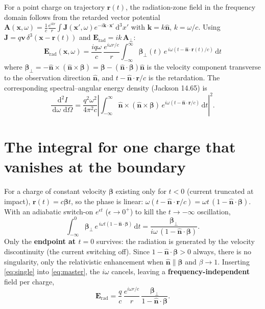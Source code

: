 \documentclass[11pt]{article}
\newcommand{\nhat}{\hat{\bm{n}}}
\newcommand{\bbeta}{\bm{\beta}}
\newcommand{\bE}{\bm{E}}
\newcommand{\bA}{\bm{A}}
\newcommand{\bJ}{\bm{J}}
\newcommand{\br}{\bm{r}}
\newcommand{\bk}{\bm{k}}
\newcommand{\bv}{\bm{v}}
\newcommand{\dd}{\,\mathrm{d}}
\begin{document}
For a point charge on trajectory $\br(t)$, the radiation-zone field in the
frequency domain follows from the retarded vector potential
$\bA(\bm{x},\omega)=\frac{1}{c}\frac{e^{ikr}}{r}\int
\bJ(\bm{x}',\omega)e^{-i\bk\cdot\bm{x}'}\dd^3x'$ with $\bk=k\nhat$,
$k=\omega/c$. Using $\bJ=q\bv\,\delta^3(\bm{x}-\br(t))$ and
$\bE_{\mathrm{rad}}=ik\,\bA_\perp$:
\begin{equation}
\boxed{\;
\bE_{\mathrm{rad}}(\bm{x},\omega)=\frac{iq\omega}{c}\,
\frac{e^{i\omega r/c}}{r}
\int_{-\infty}^{\infty}\bbeta_\perp(t)\,
e^{\,i\omega\left(t-\nhat\cdot\br(t)/c\right)}\dd t
\;}
\label{eq:master}
\end{equation}
where $\bbeta_\perp=-\nhat\times(\nhat\times\bbeta)
=\bbeta-(\nhat\cdot\bbeta)\nhat$ is the velocity component transverse to the
observation direction $\nhat$, and $t-\nhat\cdot\br/c$ is the retardation. The
corresponding spectral--angular energy density (Jackson 14.65) is
\begin{equation}
\frac{\dd^2 I}{\dd\omega\,\dd\Omega}=\frac{q^2\omega^2}{4\pi^2 c}
\left|\int_{-\infty}^{\infty}\nhat\times(\nhat\times\bbeta)\,
e^{i\omega(t-\nhat\cdot\br/c)}\dd t\right|^2 .
\label{eq:energy}
\end{equation}

\section{The integral for one charge that vanishes at the boundary}

For a charge of constant velocity $\bbeta$ existing only for $t<0$ (current
truncated at impact), $\br(t)=c\bbeta t$, so the phase is linear:
$\omega(t-\nhat\cdot\br/c)=\omega t\,(1-\nhat\cdot\bbeta)$. With an adiabatic
switch-on $e^{\epsilon t}$ ($\epsilon\to0^+$) to kill the $t\to-\infty$
oscillation,
\begin{equation}
\int_{-\infty}^{0}\bbeta_\perp\,
e^{\,i\omega t(1-\nhat\cdot\bbeta)}\dd t
=\frac{\bbeta_\perp}{i\omega\,(1-\nhat\cdot\bbeta)} .
\label{eq:single}
\end{equation}
Only the \textbf{endpoint at $t=0$} survives: the radiation is generated by the
velocity discontinuity (the current switching off). Since
$1-\nhat\cdot\bbeta>0$ always, there is no singularity, only the relativistic
enhancement when $\nhat\parallel\bbeta$ and $\beta\to1$. Inserting
\eqref{eq:single} into \eqref{eq:master}, the $i\omega$ cancels, leaving a
\textbf{frequency-independent} field per charge,
\begin{equation}
\bE_{\mathrm{rad}}=\frac{q}{c}\,\frac{e^{i\omega r/c}}{r}\,
\frac{\bbeta_\perp}{1-\nhat\cdot\bbeta}.
\end{equation}
\end{document}
